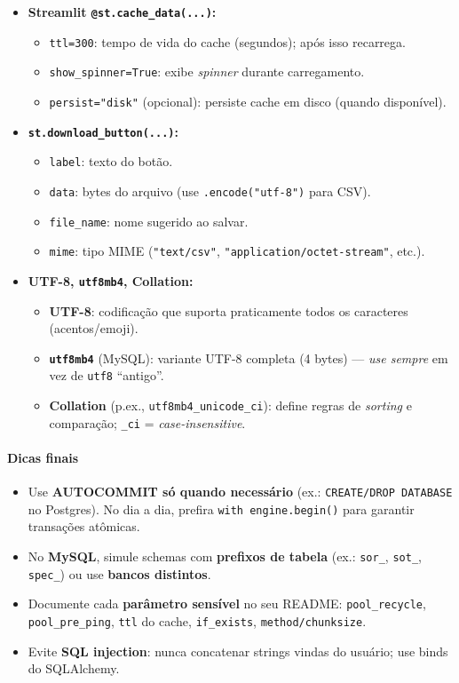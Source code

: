 \documentclass[12pt,a4paper]{article}
\begin{document}
\begin{itemize}
  \item \textbf{Streamlit \texttt{@st.cache\_data(...)}:}
  \begin{itemize}
    \item \texttt{ttl=300}: tempo de vida do cache (segundos); após isso recarrega.
    \item \texttt{show\_spinner=True}: exibe \textit{spinner} durante carregamento.
    \item \texttt{persist="disk"} (opcional): persiste cache em disco (quando disponível).
  \end{itemize}

  \item \textbf{\texttt{st.download\_button(...)}:}
  \begin{itemize}
    \item \texttt{label}: texto do botão.
    \item \texttt{data}: bytes do arquivo (use \texttt{.encode("utf-8")} para CSV).
    \item \texttt{file\_name}: nome sugerido ao salvar.
    \item \texttt{mime}: tipo MIME (\texttt{"text/csv"}, \texttt{"application/octet-stream"}, etc.).
  \end{itemize}

  \item \textbf{UTF-8, \texttt{utf8mb4}, Collation:}
  \begin{itemize}
    \item \textbf{UTF-8}: codificação que suporta praticamente todos os caracteres (acentos/emoji).
    \item \textbf{\texttt{utf8mb4}} (MySQL): variante UTF-8 completa (4 bytes) — \textit{use sempre} em vez de \texttt{utf8} “antigo”.
    \item \textbf{Collation} (p.ex., \texttt{utf8mb4\_unicode\_ci}): define regras de \textit{sorting} e comparação; \texttt{\_ci} = \textit{case-insensitive}.
  \end{itemize}
\end{itemize}

\paragraph{Dicas finais}
\begin{itemize}
  \item Use \textbf{AUTOCOMMIT só quando necessário} (ex.: \texttt{CREATE/DROP DATABASE} no Postgres). No dia a dia, prefira \texttt{with engine.begin()} para garantir transações atômicas.
  \item No \textbf{MySQL}, simule schemas com \textbf{prefixos de tabela} (ex.: \texttt{sor\_}, \texttt{sot\_}, \texttt{spec\_}) ou use \textbf{bancos distintos}.
  \item Documente cada \textbf{parâmetro sensível} no seu README: \texttt{pool\_recycle}, \texttt{pool\_pre\_ping}, \texttt{ttl} do cache, \texttt{if\_exists}, \texttt{method/chunksize}.
  \item Evite \textbf{SQL injection}: nunca concatenar strings vindas do usuário; use binds do SQLAlchemy.
\end{itemize}
\end{document}

